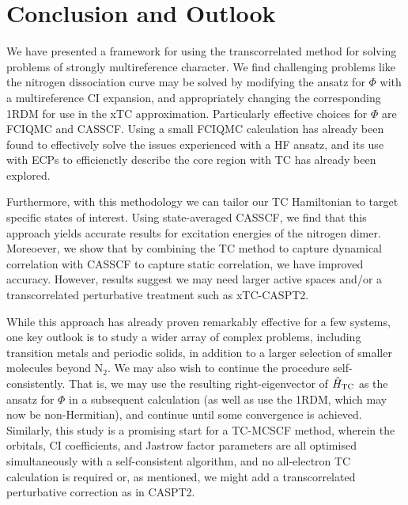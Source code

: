 \section{Conclusion and Outlook}

We have presented a framework for using the transcorrelated method for solving problems of strongly multireference character. We find challenging problems like the nitrogen dissociation curve may be solved by modifying the ansatz for $\Phi$ with a multireference CI expansion, and appropriately changing the corresponding 1RDM for use in the xTC approximation. Particularly effective choices for $\Phi$ are FCIQMC and CASSCF. Using a small FCIQMC calculation has already been found to effectively solve the issues experienced with a HF ansatz, and its use with \glspl{ECP} to efficienctly describe the core region with TC has already been explored.\supercite{simulaEcp}

Furthermore, with this methodology we can tailor our TC Hamiltonian to target specific states of interest. Using state-averaged CASSCF, we find that this approach yields accurate results for excitation energies of the nitrogen dimer. Moreoever, we show that by combining the TC method to capture dynamical correlation with CASSCF to capture static correlation, we have improved accuracy. However, results suggest we may need larger active spaces and/or a transcorrelated perturbative treatment such as xTC-\gls{CASPT2}.

While this approach has already proven remarkably effective for a few systems, one key outlook is to study a wider array of complex problems, including transition metals and periodic solids, in addition to a larger selection of smaller molecules beyond N$_2$. We may also wish to continue the procedure self-consistently. That is, we may use the resulting right-eigenvector of $\hat H_\mathrm{TC}$ as the ansatz for $\Phi$ in a subsequent calculation (as well as use the 1RDM, which may now be non-Hermitian), and continue until some convergence is achieved. Similarly, this study is a promising start for a \gls{TC}-\gls{MCSCF} method, wherein the orbitals, CI coefficients, and Jastrow factor parameters are all optimised simultaneously with a self-consistent algorithm, and no all-electron TC calculation is required or, as mentioned, we might add a transcorrelated perturbative correction as in \gls{CASPT2}.
